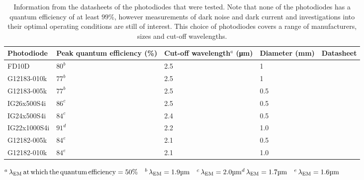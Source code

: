 \begin{table}
	\centering
		\begin{tabular}{| p{24mm} | p{25mm} |  p{25mm} | p{19mm}  | c |}
			\hline
			Photodiode & Peak quantum efficiency (\%) & Cut-off wavelength$^a$ (\si{\micro\meter}) & Diameter  (\si{\milli\metre}) & Datasheet\\
			\hline
			FD10D & $80^b$ & 2.5 & 1 &\cite{FD10D}\\
			G12183-010k & $77^b$ & 2.5 & 1 &\cite{g12183_datasheet}\\
			G12183-005k & $77^b$ & 2.5 & 0.5 &\cite{g12183_datasheet}\\
			IG26x500S4i & $86^c$ & 2.5& 0.5 &\cite{ig26}\\
			IG24x500S4i & $84^c$ & 2.4& 0.5 &\cite{ig24}\\
			IG22x1000S4i & $91^d$ & 2.2 & 1.0 &\cite{ig22}\\
			G12182-005k & $84^e$ & 2.1& 0.5 &\cite{g12182_datasheet} \\
			G12182-010k & $84^e$ & 2.1& 1.0 &\cite{g12182_datasheet}\\

			\hline
		\end{tabular}	
	\footnotesize{$^a\,\lambda_{\rm{EM}}\,\text{at\,which\,the\,quantum\,efficiency} = 50\%\quad^b\,\lambda_{\rm{EM}} = 1.9\si{\micro\metre}\quad^c\,\lambda_{\rm{EM}} = 2.0\si{\micro\metre}\newline ^d\,\lambda_{\rm{EM}} = 1.7\si{\micro\metre} \quad^e\,\lambda_{\rm{EM}} = 1.6\si{\micro\metre}$}
	\caption[Information from the datasheets of the photodiodes that were tested.]{Information from the datasheets of the photodiodes that were tested. Note that none of the photodiodes has a quantum efficiency of at least $99\%$, however measurements of dark noise and dark current and investigations into their optimal operating conditions are still of interest. This choice of photodiodes covers a range of manufacturers, sizes and cut-off wavelengths.}
	\label{tab:pd_chapter_photodiodes_tested}
\end{table}
